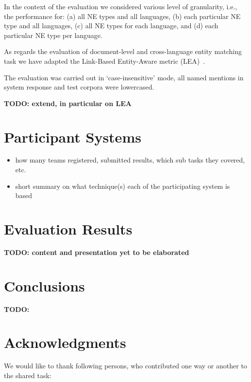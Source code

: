 \documentclass[11pt]{article}
\begin{document}
In the context of the evaluation we considered various level of granularity, i.e., the performance for: 
(a) all NE types and all languages, (b) each particular NE type and all languages, (c) all NE types for each language,
and (d) each particular NE type per language. 

As regards the evaluation of document-level and cross-language entity matching task we have adapted the 
Link-Based Entity-Aware metric (LEA)~\cite{DBLP:conf-acl-Moosavi016}.

The evaluation was carried out in `case-insensitive' mode, all named mentions in system response and test corpora were 
lowercased.

\textbf{TODO: extend, in particular on LEA}

\section{Participant Systems}
\label{sec:participants}

\begin{itemize}

\item how many teams registered, submitted results, which sub tasks they covered, etc.

\item short summary on what technique(s) each of the participating system is based

\end{itemize}

\section{Evaluation Results}
\label{sec:results}

\textbf{TODO: content and presentation yet to be elaborated}

\section{Conclusions}
\label{sec:conclusions}

\textbf{TODO:}

\section*{Acknowledgments}

We would like to thank following persons, who contributed one way or another to the shared task:



\end{document}
